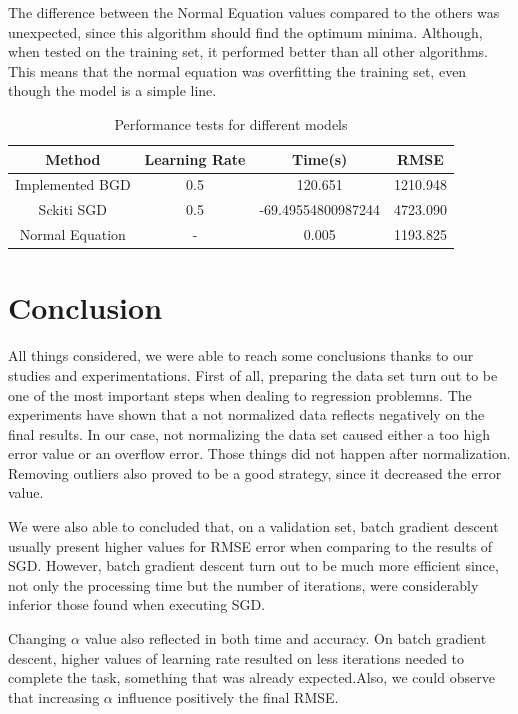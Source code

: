 \documentclass[conference]{IEEEtran}
\begin{document}
	The difference between the Normal Equation values compared to the others was unexpected, since this algorithm should find the optimum minima. Although, when tested on the training set, it performed better than all other algorithms. This means that the normal equation was overfitting the training set, even though the model is a simple line.
	
  \begin{table}[h!]
    \begin{center}
      \caption{Performance tests for different models}
      \label{table:table2}
      \begin{tabular}[10pt]{c|c|c|c}
        Method & Learning Rate & Time(s) & RMSE\\
        \hline
        Implemented BGD & 0.5 & 120.651 & 1210.948 \\
        Sckiti SGD& 0.5 & -69.49554800987244 & 4723.090 \\
        Normal Equation & - & 0.005 & 1193.825 \\
    \end{tabular}
  \end{center}
\end{table}
	

\section{Conclusion}

    
    All things considered, we were able to reach some conclusions thanks to our studies and experimentations. First of all, preparing the data set turn out to be one of the most important steps when dealing to regression problemns. The experiments have shown that a not normalized data reflects negatively on the final results. In our case, not normalizing the data set caused either a too high error value or an overflow error. Those things did not happen after normalization. Removing outliers also proved to be a good strategy, since it decreased the error value. \par
    
   We were also able to concluded that, on a validation set, batch gradient descent usually present higher values for RMSE error when comparing to the results of SGD. However, batch gradient descent turn out to be much more efficient since, not only the processing time but the number of iterations, were considerably inferior those found when executing SGD.\par
   
    Changing $\alpha$ value also reflected in both time and accuracy. On batch gradient descent, higher values of learning rate resulted on less iterations needed to complete the task, something that was already expected.Also, we could observe that increasing $\alpha$ influence positively the final RMSE.\par
    
\end{document}
